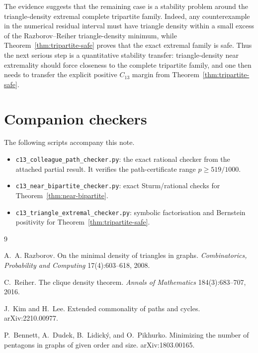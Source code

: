 \documentclass[11pt]{article}
\begin{document}
The evidence suggests that the remaining case is a stability problem around the
triangle-density extremal complete tripartite family.  Indeed, any counterexample
in the numerical residual interval must have triangle density within a small
excess of the Razborov--Reiher triangle-density minimum, while
Theorem~\ref{thm:tripartite-safe} proves that the exact extremal family is safe.
Thus the next serious step is a quantitative stability transfer: triangle-density
near extremality should force closeness to the complete tripartite family, and
one then needs to transfer the explicit positive $C_{13}$ margin from
Theorem~\ref{thm:tripartite-safe}.

\section*{Companion checkers}

The following scripts accompany this note.
\begin{itemize}[leftmargin=2em]
\item \texttt{c13\_colleague\_path\_checker.py}: the exact rational checker from
the attached partial result.  It verifies the path-certificate range
$p\ge519/1000$.
\item \texttt{c13\_near\_bipartite\_checker.py}: exact Sturm/rational checks for
Theorem~\ref{thm:near-bipartite}.
\item \texttt{c13\_triangle\_extremal\_checker.py}: symbolic factorisation and
Bernstein positivity for Theorem~\ref{thm:tripartite-safe}.
\end{itemize}

\begin{thebibliography}{9}

A.~A. Razborov.
\newblock On the minimal density of triangles in graphs.
\newblock \emph{Combinatorics, Probability and Computing} 17(4):603--618, 2008.

C.~Reiher.
\newblock The clique density theorem.
\newblock \emph{Annals of Mathematics} 184(3):683--707, 2016.

J.~Kim and H.~Lee.
\newblock Extended commonality of paths and cycles.
\newblock arXiv:2210.00977.

P.~Bennett, A.~Dudek, B.~Lidick\'y, and O.~Pikhurko.
\newblock Minimizing the number of pentagons in graphs of given order and size.
\newblock arXiv:1803.00165.

\end{thebibliography}
\end{document}
